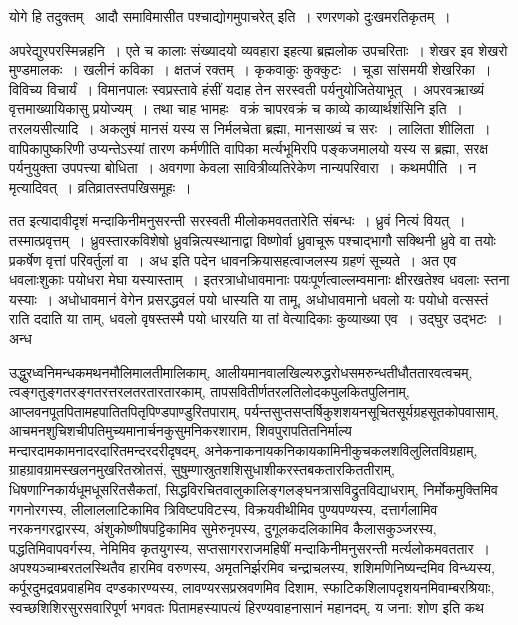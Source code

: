 \documentclass[11pt, openany]{book}
\begin{document}
\noindent
{\s योगे हि तदुक्तम् \textendash\ {\qt आदौ समाविमासीत पश्चाद्योगमुपाचरेत्} इति~। रणरणको दुःखमरतिकृतम्~।

अपरेद्युरपरस्मिन्नहनि~। एते च कालाः संख्यादयो व्यवहारा इहत्या ब्रह्मलोक उपचरिताः~। शेखर इव शेखरो मुण्डमालकः~। खलीनं कविका~। क्षतजं रक्तम्~। कृकवाकुः कुक्कुटः~। चूडा सांसमयी शेखरिका~। विविच्य विचार्यं~। विमानपालः स्वप्रस्तावे हंसीं यदाह तेन सरस्वती पर्यनुयोजितेयाभूत्~। अपरवऋाख्यं वृत्तमाख्यायिकासु प्रयोज्यम्~। तथा चाह भामहः \textendash\ {\qt वक्रं चापरवक्रं च काव्ये काव्यार्थशंसिनि} इति~। {\qtt तरलयसीत्यादि}~। अकलुषं मानसं यस्य स निर्मलचेता ब्रह्मा, मानसाख्यं च सरः~। लालिता शीलिता~। वापिकापुष्करिणी उप्यन्तेऽस्यां तारण कर्मणीति वापिका मर्त्यभूमिरपि पङ्कजमालयो यस्य स ब्रह्मा, सरक्ष पर्यनुयुक्ता उपपत्त्या बोधिता~। अवगणा केवला सावित्रीव्यतिरेकेण नान्यपरिवारा~। {\qtt कथमपीति}~। न मृत्यादिवत्~। व्रतिव्रातस्तपखिसमूहः~।

तत इत्यादावीदृशं मन्दाकिनीमनुसरन्ती सरस्वती मीलोकमवततारेति संबन्धः~। ध्रुवं नित्यं वियत्~। तस्मात्प्रवृत्तम्~। ध्रुवस्तारकविशेषो ध्रुवन्नित्यस्थानाद्वा विष्णोर्वा ध्रुवाचूरू पश्चाद्भागौ सक्थिनी ध्रुवे वा तयोः प्रकर्षेण वृत्तां परिवर्तुलां वा~। अध इति पदेन धावनक्रियासहत्वाजलस्य ग्रहणं सूच्यते~। अत एव धवलाःशुकाः पयोधरा मेघा यस्यास्ताम्~। इतरत्राधोधावमानाः पयःपूर्णत्वाल्लम्वमानाः क्षीरखतेश्व धवलाः स्तना यस्याः~। अधोधावमानं वेगेन प्रसरद्धवलं पयो धास्यति या तामू, अधोधावमानो धवलो यः पयोधो वत्सस्तं राति ददाति या ताम्, धवलो वृषस्तस्मै पयो धारयति या तां वेत्यादिकाः कुव्याख्या एव~। उद्घुर उद्भटः~। अन्ध\textendash}

\newpage

\noindent
उद्धुरध्वनिमन्धकमथनमौलिमालतीमालिकाम्, आलीयमानवालखिल्यरुद्धरोधसमरुन्धतीधौततारवत्वचम्, त्वङ्गतुङ्गतरङ्गतरत्तरलतरतारतारकाम्, तापसवितीर्णतरलतिलोदकपुलकितपुलिनाम्, आप्लवनपूतपितामहपातितपितृपिण्डपाण्डुरितपाराम्, पर्यन्तसुप्तसप्तर्षिकुशशयनसूचितसूर्यग्रहसूतकोपवासाम्, आचमनशुचिशचीपतिमुच्यमानार्चनकुसुमनिकरशाराम, शिवपुरापतितनिर्माल्य मन्दारदामकामनादरदारितमन्दरदरीदृषदम्, अनेकनाकनायकनिकायकामिनीकुचकलशविलुलितविग्रहाम्, ग्राहग्रावग्रामस्खलनमुखरितस्रोतसं, सुषुम्णास्रुतशशिसुधाशीकरस्तबकतारकिततीराम्, धिषणाग्निकार्यधूमधूसरितसैकतां, सिद्धविरचितवालुकालिङ्गलङ्घनत्रासविद्रुतविद्याधराम्, निर्मोकमुक्तिमिव गगनोरगस्य, लीलाललाटिकामिव त्रिविष्टपविटस्य, विक्रयवीथीमिव पुण्यपण्यस्य, दत्तार्गलामिव नरकनगरद्वारस्य, अंशुकोष्णीषपट्टिकामिव सुमेरुनृपस्य, दुगूलकदलिकामिव कैलासकुञ्जरस्य, पद्धतिमिवापवर्गस्य, नेमिमिव कृतयुगस्य, सप्तसागरराजमहिषीं मन्दाकिनीमनुसरन्ती मर्त्यलोकमवततार~। अपश्यञ्चाम्बरतलस्थितैव हारमिव वरुणस्य, अमृतनिर्झरमिव चन्द्राचलस्य, शशिमणिनिष्यन्दमिव विन्ध्यस्य, कर्पूरदुमद्रवप्रवाहमिव दण्डकारण्यस्य, लावण्यरसप्रस्रवणमिव दिशाम, स्फाटिकशिलापदृशयनमिवाम्बरश्रियाः, स्वच्छशिशिरसुरसवारिपूर्ण भगवतः पितामहस्यापत्यं हिरण्यवाहनासानं महानदम्, य जना: शोण इति कथ\textendash
\end{document}
